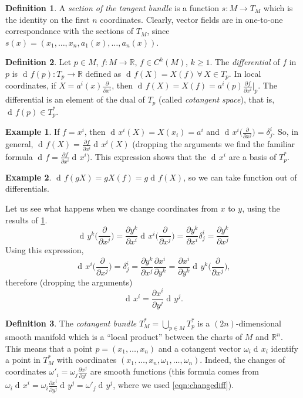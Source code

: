 \documentclass[a4paper,12pt]{book}
\newcommand{\dd}{\mathop{\mathrm{d}\!}{}}
\theoremstyle{definition}
\newtheorem{definition}{Definition}
\newtheorem{example}{Example}
\theoremstyle{remark}
\begin{document}
\begin{definition}
A \emph{section of the tangent bundle} is a function $s\colon M\to T_M$ which is the identity on the first $n$ coordinates. Clearly, vector fields are in one-to-one correspondance with the sections of $T_M$, since $s(x)=(x_1,\ldots,x_n,a_1(x),\ldots,a_n(x))$.
\end{definition}

\begin{definition}
Let $p\in M$, $f\colon M\to \mathbb R$, $f\in C^k(M)$, $k\ge1$. The \emph{differential} of $f$ in $p$ is $\dd f(p)\colon T_p\to\mathbb R$ defined as $\dd f(X)=X(f)\ \forall\,X\in T_p$. In local coordinates, if $X=a^i(x)\frac{\partial}{\partial x^i}$, then $\dd f(X)=X(f)=a^i(p)\frac{\partial f}{\partial x^i}\big|_p$. The differential is an element of the dual of $T_p$ (called \emph{cotangent space}), that is, $\dd f(p)\in T_p^*$.
\end{definition}

\begin{example}
\label{example:differential}
If $f=x^i$, then $\dd x^i(X)=X(x_i)=a^i$ and $\dd x^i\bigl(\frac{\partial}{\partial x^j}\bigr)=\delta^i_j$. So, in general, $\dd f(X)=\frac{\partial f}{\partial x^i}\dd x^i(X)$ (dropping the arguments we find the familiar formula $\dd f=\frac{\partial f}{\partial x^i}\dd x^i$). This expression shows that the $\dd x^i$ are a basis of $T_p^*$.
\end{example}

\begin{example}
$\dd f(gX)=gX(f)=g\dd f(X)$, so we can take function out of differentials.
\end{example}

Let us see what happens when we change coordinates from $x$ to $y$, using the results of \cref{example:differential}.
\[\dd y^k\biggl(\frac{\partial}{\partial x^j}\biggr)=\frac{\partial y^k}{\partial x^i}\dd x^i\biggl(\frac{\partial}{\partial x^j}\biggr)=\frac{\partial y^k}{\partial x^i}\delta^i_j=\frac{\partial y^k}{\partial x^j}\]
Using this expression,
\[\dd x^i\biggl(\frac{\partial}{\partial x^j}\biggr)=\delta^i_j=\frac{\partial y^k}{\partial x^j}\frac{\partial x^i}{\partial y^k}=\frac{\partial x^i}{\partial y^k}\dd y^k\biggl(\frac{\partial}{\partial x^j}\biggr),\]
therefore (dropping the arguments)
\begin{equation}
\dd x^i=\frac{\partial x^i}{\partial y^j}\dd y^j.
\label{eqn:changediff}
\end{equation}

\begin{definition}
The \emph{cotangent bundle} $T_M^*=\bigcup_{p\in M}T_p^*$ is a $(2n)$-dimensional smooth manifold which is a ``local product'' between the charts of $M$ and $\mathbb R^n$. This means that a point $p=(x_1,\ldots,x_n)$ and a cotangent vector $\omega_i\dd x_i$ identify a point in $T_M^*$ with coordinates $(x_1,\ldots,x_n,\omega_1,\ldots,\omega_n)$. Indeed, the changes of coordinates $\omega'_i=\omega_j\frac{\partial x^j}{\partial y^i}$ are smooth functions (this formula comes from $\omega_i\dd x^i=\omega_i\frac{\partial x^i}{\partial y^j}\dd y^j=\omega'_j\dd y^j$, where we used \cref{eqn:changediff}).
\end{definition}
\end{document}
